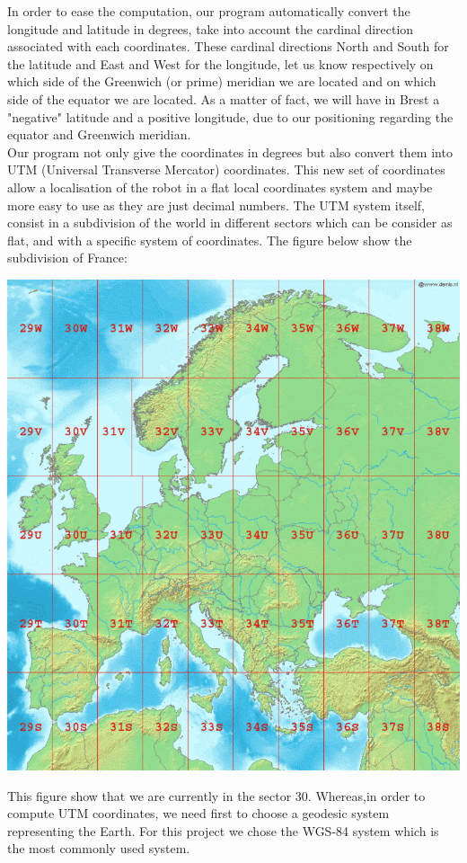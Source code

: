 In order to ease the computation, our program automatically convert the longitude and latitude in degrees, take into account the cardinal direction associated with each coordinates.
These cardinal directions North and South for the latitude and East and West for the longitude, let us know respectively on which side of the Greenwich (or prime) meridian we are located and on which side of the equator we are located. As a matter of fact, we will have in Brest a "negative" latitude and a positive longitude, due to our positioning regarding the equator and Greenwich meridian.\\

Our program not only give the coordinates in degrees but also convert them into UTM (Universal Transverse Mercator) coordinates. This new set of coordinates allow a localisation of the robot in a flat local coordinates system and maybe more easy to use as they are just decimal numbers. The UTM system itself, consist in a subdivision of the world in different sectors which can be consider as flat, and with a specific system of coordinates.
The figure below show the subdivision of France: \

\begin{center}
\includegraphics[scale=0.2]{secteurUTM.png} 
\label{fig1}
\end{center}

This figure show that we are currently in the sector 30. Whereas,in order to compute UTM coordinates, we need first to choose a geodesic system representing the Earth. For this project we chose the WGS-84 system which is the most commonly used system.


